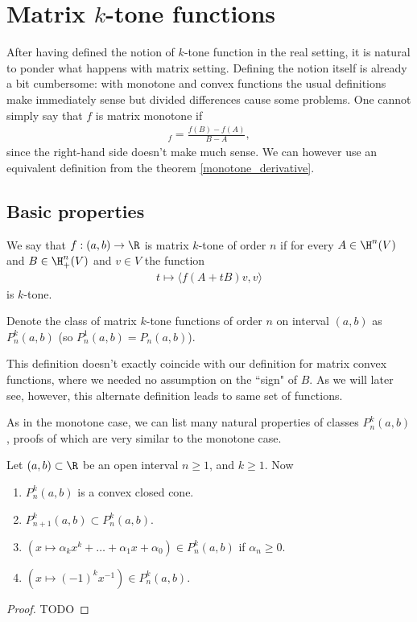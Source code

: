 \chapter{Matrix $k$-tone functions}

After having defined the notion of $k$-tone function in the real setting, it is natural to ponder what happens with matrix setting. Defining the notion itself is already a bit cumbersome: with monotone and convex functions the usual definitions make immediately sense but divided differences cause some problems. One cannot simply say that $f$ is matrix monotone if
\begin{align*}
	[A, B]_{f} = \frac{f(B) - f(A)}{B - A},
\end{align*}
since the right-hand side doesn't make much sense. We can however use an equivalent definition from the theorem \ref{monotone_derivative}.

\section{Basic properties}

\begin{maar}
	We say that $f : (a, b) \to \R$ is matrix $k$-tone of order $n$ if for every $A \in \H^{n}(V)$ and $B \in \H^{n}_{+}(V)$ and $v \in V$ the function
	\begin{align*}
		t \mapsto \langle f(A + t B) v, v \rangle
	\end{align*}
	is $k$-tone.
\end{maar}

Denote the class of matrix $k$-tone functions of order $n$ on interval $(a, b)$ as $P^{k}_{n}(a, b)$ (so $P^{1}_{n}(a, b) = P_{n}(a, b)$).

This definition doesn't exactly coincide with our definition for matrix convex functions, where we needed no assumption on the ``sign" of $B$. As we will later see, however, this alternate definition leads to same set of functions.


As in the monotone case, we can list many natural properties of classes $P^{k}_{n}(a, b)$, proofs of which are very similar to the monotone case.

\begin{prop}
	Let $(a, b) \subset \R$ be an open interval $n \geq 1$, and $k \geq 1$. Now
	\begin{enumerate}
		\item $P_{n}^{k}(a, b)$ is a convex closed cone.
		\item $P_{n + 1}^{k}(a, b) \subset P_{n}^{k}(a, b)$.
		\item $\left(x \mapsto \alpha_{k} x^{k} + \ldots + \alpha_{1} x + \alpha_{0}\right) \in P^{k}_{n}(a, b)$ if $\alpha_{n} \geq 0$.
		\item $\left(x \mapsto (-1)^k x^{-1}\right) \in P^{k}_{n}(a, b)$.
	\end{enumerate}
\end{prop}
\begin{proof}
	TODO
\end{proof}

